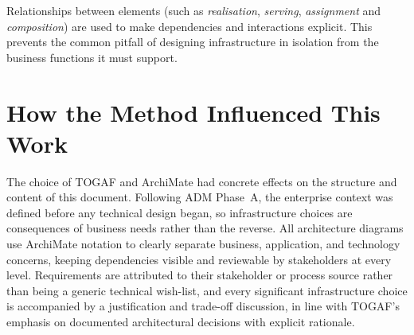 Relationships between elements (such as \emph{realisation}, \emph{serving}, \emph{assignment} and \emph{composition}) are used to make dependencies and interactions explicit. This prevents the common pitfall of designing infrastructure in isolation from the business functions it must support.

\section{How the Method Influenced This Work}

The choice of TOGAF and ArchiMate had concrete effects on the structure and content of this document. Following ADM Phase~A, the enterprise context was defined before any technical design began, so infrastructure choices are consequences of business needs rather than the reverse. All architecture diagrams use ArchiMate notation to clearly separate business, application, and technology concerns, keeping dependencies visible and reviewable by stakeholders at every level. Requirements are attributed to their stakeholder or process source rather than being a generic technical wish-list, and every significant infrastructure choice is accompanied by a justification and trade-off discussion, in line with TOGAF's emphasis on documented architectural decisions with explicit rationale.

